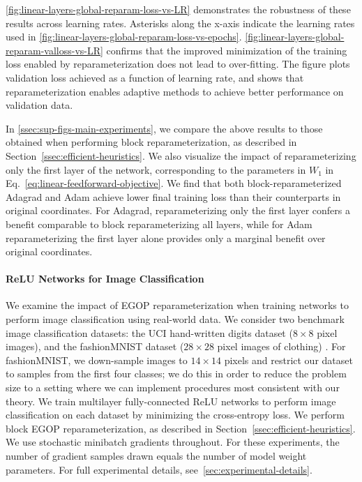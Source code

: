 \documentclass{article}
\begin{document}
\cref{fig:linear-layers-global-reparam-loss-vs-LR} demonstrates the robustness of these results across learning rates. Asterisks along the x-axis indicate the learning rates used in \cref{fig:linear-layers-global-reparam-loss-vs-epochs}. \cref{fig:linear-layers-global-reparam-valloss-vs-LR} confirms that the improved minimization of the training loss enabled by reparameterization does not lead to over-fitting. The figure plots validation loss achieved as a function of learning rate, and shows that reparameterization enables adaptive methods to achieve better performance on validation data.

In \cref{ssec:sup-figs-main-experiments}, we compare the above results to those obtained when performing block reparameterization, as described in Section~\ref{ssec:efficient-heuristics}. We also visualize the impact of reparameterizing only the first layer of the network, corresponding to the parameters in $W_1$ in Eq.~\ref{eq:linear-feedforward-objective}. We find that both block-reparameterized Adagrad and Adam achieve lower final training loss than their counterparts in original coordinates. For Adagrad, reparameterizing only the first layer confers a benefit comparable to block reparameterizing all layers, while for Adam reparameterizing the first layer alone provides only a marginal benefit over original coordinates.

\paragraph{ReLU Networks for Image Classification} We examine the impact of EGOP reparameterization when training networks to perform image classification using real-world data. We consider two benchmark image classification datasets: the UCI hand-written digits dataset ($8\times 8$ pixel images), and the fashionMNIST dataset ($28\times 28$ pixel images of clothing) \cite{optical_recognition_of_handwritten_digits_80,xiao2017fashion}. For fashionMNIST, we down-sample images to $14\times 14$ pixels and restrict our dataset to samples from the first four classes; we do this in order to reduce the problem size to a setting where we can implement procedures most consistent with our theory. We train multilayer fully-connected ReLU networks to perform image classification on each dataset by minimizing the cross-entropy loss. We perform block EGOP reparameterization, as described in Section~\ref{ssec:efficient-heuristics}. We use stochastic minibatch gradients throughout. For these experiments, the number of gradient samples drawn equals the number of model weight parameters. For full experimental details, see~\cref{sec:experimental-details}.
\end{document}
